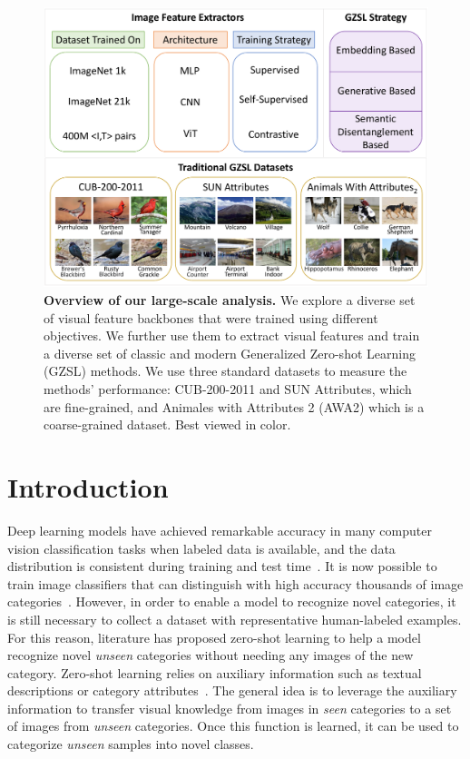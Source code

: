 \begin{figure}[t!]
    \centering
    \includegraphics[width=\linewidth]{Images/FIG1_CVPR.pdf}
    \caption{\textbf{Overview of our large-scale analysis.} We explore a diverse set of visual feature backbones that were trained using different objectives. We further use them to extract visual features and train a diverse set of classic and modern Generalized Zero-shot Learning (GZSL) methods. We use three standard datasets to measure the methods' performance: CUB-200-2011 and SUN Attributes, which are fine-grained, and Animales with Attributes 2 (AWA2) which is a coarse-grained dataset. Best viewed in color.}
    \label{fig:figure1}
    \vspace{-0.1in}
\end{figure}

\section{Introduction}

Deep learning models have achieved remarkable accuracy in many computer vision classification tasks when labeled data is available, and the data distribution is consistent during training and test time~\cite{effectivenessData, revisitEffectivenessData, Ren2015FasterRT}. It is now possible to train image classifiers that can distinguish with high accuracy thousands of image categories~\cite{Russakovsky2015ImageNetLS}. 
However, in order to enable a model to recognize novel categories, it is still necessary to collect a dataset with representative human-labeled examples.
For this reason, literature has proposed zero-shot learning to help a model recognize novel {\em unseen} categories without needing any images of the new category. Zero-shot learning relies on auxiliary information such as textual descriptions or category attributes~\cite{5206772,elhoseiny2013write,lampert2013attribute}. 
The general idea is to leverage the auxiliary information to transfer visual knowledge from images in {\em seen} categories to a set of images from {\em unseen} categories. 
Once this function is learned, it can be used to categorize {\em unseen} samples into novel classes.


